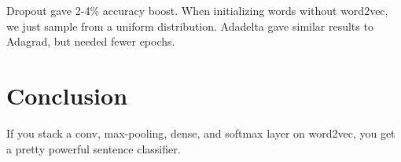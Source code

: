 \documentclass[a4paper]{article}
\begin{document}
Dropout gave 2-4\% accuracy boost. When initializing words without word2vec,
we just sample from a uniform distribution. Adadelta gave similar results to
Adagrad, but needed fewer epochs.

\section{Conclusion}
If you stack a conv, max-pooling, dense, and softmax layer on word2vec, you
get a pretty powerful sentence classifier.
\end{document}
